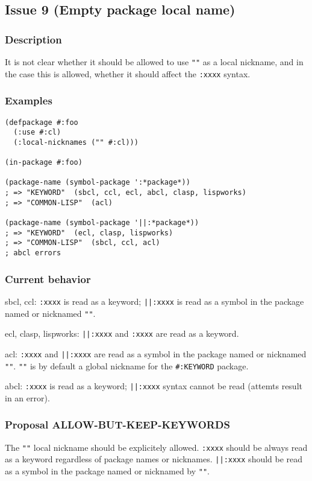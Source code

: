 \documentclass[11pt]{article}
\begin{document}
\subsection{Issue 9 (Empty package local name)}
\label{sec:org2b60e2e}
\subsubsection{Description}
\label{sec:org46bc3c3}
It is not clear whether it should be allowed to use \texttt{""} as a local nickname,
and in the case this is allowed, whether it should affect the \texttt{:xxxx} syntax.
\subsubsection{Examples}
\label{sec:orgd848ea7}
\begin{verbatim}
(defpackage #:foo
  (:use #:cl)
  (:local-nicknames ("" #:cl)))

(in-package #:foo)

(package-name (symbol-package ':*package*))
; => "KEYWORD"  (sbcl, ccl, ecl, abcl, clasp, lispworks)
; => "COMMON-LISP"  (acl)

(package-name (symbol-package '||:*package*))
; => "KEYWORD"  (ecl, clasp, lispworks)
; => "COMMON-LISP"  (sbcl, ccl, acl)
; abcl errors
\end{verbatim}
\subsubsection{Current behavior}
\label{sec:org9043d01}
sbcl, ccl:
\texttt{:xxxx} is read as a keyword;
\texttt{||:xxxx} is read as a symbol in the package named or nicknamed \texttt{""}.

ecl, clasp, lispworks:
\texttt{||:xxxx} and \texttt{:xxxx} are read as a keyword.

acl:
\texttt{:xxxx} and \texttt{||:xxxx} are read as a symbol in the package named or nicknamed \texttt{""}.
\texttt{""} is by default a global nickname for the \texttt{\#:KEYWORD} package.

abcl:
\texttt{:xxxx} is read as a keyword;
\texttt{||:xxxx} syntax cannot be read (attemts result in an error).
\subsubsection{Proposal ALLOW-BUT-KEEP-KEYWORDS}
\label{sec:orga313bb7}
The \texttt{""} local nickname should be explicitely allowed. \texttt{:xxxx} should be always
read as a keyword regardless of package names or nicknames. \texttt{||:xxxx} should be
read as a symbol in the package named or nicknamed by \texttt{""}.
\end{document}
